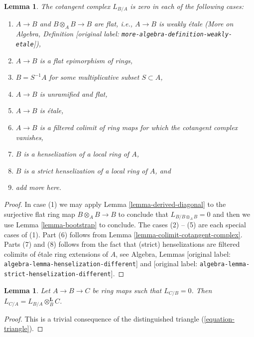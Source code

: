 \documentclass[10pt,a4paper]{article}
\theoremstyle{plain}
\newtheorem{lemma}[subsection]{Lemma}
\theoremstyle{definition}
\theoremstyle{remark}
\numberwithin{equation}{subsection}
\begin{document}
\begin{lemma}
\label{lemma-when-zero}
The cotangent complex $L_{B/A}$ is zero in each of the following cases:
\begin{enumerate}
\item $A \to B$ and $B \otimes_A B \to B$ are flat, i.e., $A \to B$
is weakly \'etale
(More on Algebra, Definition \textnormal{[original label: \nolinkurl{more-algebra-definition-weakly-etale}]}),
\item $A \to B$ is a flat epimorphism of rings,
\item $B = S^{-1}A$ for some multiplicative subset $S \subset A$,
\item $A \to B$ is unramified and flat,
\item $A \to B$ is \'etale,
\item $A \to B$ is a filtered colimit of ring maps for which
the cotangent complex vanishes,
\item $B$ is a henselization of a local ring of $A$,
\item $B$ is a strict henselization of a local ring of $A$, and
\item add more here.
\end{enumerate}
\end{lemma}

\begin{proof}
In case (1) we may apply
Lemma \ref{lemma-derived-diagonal}
to the surjective flat ring map $B \otimes_A B \to B$
to conclude that $L_{B/B \otimes_A B} = 0$ and then we use
Lemma \ref{lemma-bootstrap}
to conclude. The cases (2) -- (5) are each special cases of (1).
Part (6) follows from Lemma \ref{lemma-colimit-cotangent-complex}.
Parts (7) and (8) follows from the fact that (strict) henselizations
are filtered colimits of \'etale ring extensions of $A$, see
Algebra, Lemmas \textnormal{[original label: \nolinkurl{algebra-lemma-henselization-different}]} and
\textnormal{[original label: \nolinkurl{algebra-lemma-strict-henselization-different}]}.
\end{proof}

\begin{lemma}
\label{lemma-localize-on-top}
Let $A \to B \to C$ be ring maps such that $L_{C/B} = 0$.
Then $L_{C/A} = L_{B/A} \otimes_B^\mathbf{L} C$.
\end{lemma}

\begin{proof}
This is a trivial consequence of 
the distinguished triangle (\ref{equation-triangle}).
\end{proof}
\end{document}
